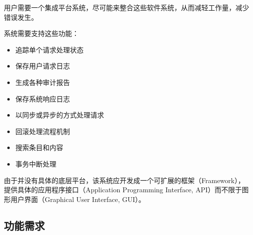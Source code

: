 \documentclass[cs4size,a4paper,nofonts]{ctexart}
\begin{document}
用户需要一个集成平台系统，尽可能来整合这些软件系统，从而减轻工作量，减少错误发生。

系统需要支持这些功能：

\begin{itemize}
\item 追踪单个请求处理状态
\item 保存用户请求日志
\item 生成各种审计报告
\item 保存系统响应日志
\item 以同步或异步的方式处理请求
\item 回滚处理流程机制
\item 搜索条目和内容
\item 事务中断处理
\end{itemize}

由于并没有具体的底层平台，该系统应开发成一个可扩展的框架（Framework），提供具体的应用程序接口（Application Programming Interface, API）而不限于图形用户界面（Graphical User Interface, GUI）。






\subsection{功能需求}
\end{document}
